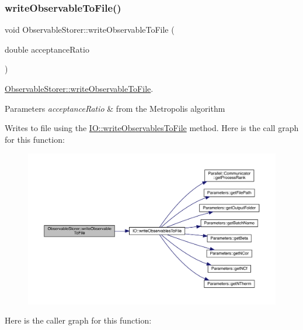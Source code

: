 \subsubsection{\texorpdfstring{writeObservableToFile()}{writeObservableToFile()}}
{\footnotesize\ttfamily void Observable\+Storer\+::write\+Observable\+To\+File (\begin{DoxyParamCaption}\item[{double}]{acceptance\+Ratio }\end{DoxyParamCaption})}



\mbox{\hyperlink{class_observable_storer_a146f9acb8a0a2ce15782d26bdc4f0bf9}{Observable\+Storer\+::write\+Observable\+To\+File}}. 


\begin{DoxyParams}{Parameters}
{\em acceptance\+Ratio} & from the Metropolis algorithm\\
\hline
\end{DoxyParams}
Writes to file using the \mbox{\hyperlink{namespace_i_o_ad8cf5aef8f60d10b80292b69a091d5ac}{I\+O\+::write\+Observables\+To\+File}} method. Here is the call graph for this function\+:\nopagebreak
\begin{figure}[H]
\begin{center}
\leavevmode
\includegraphics[width=350pt]{class_observable_storer_a146f9acb8a0a2ce15782d26bdc4f0bf9_cgraph}
\end{center}
\end{figure}
Here is the caller graph for this function\+:\nopagebreak
